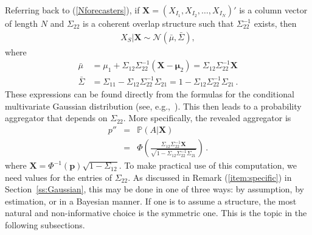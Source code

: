 \documentclass[11pt]{article}
\renewcommand{\P}{\mathbb{P}}
\theoremstyle{definition}
\theoremstyle{definition}
\def\one{{\bf 1}}
\def\P{{\mathbb P}}
\def\probit{p_{\rm probit}}
\begin{document}
Referring back to (\ref{Nforecasters}), if $\boldsymbol{X} = 
(X_{I_1}, X_{I_2},  \dots, X_{I_N})'$ is a column vector 
of length $N$ and $\Sigma_{22}$ is a coherent overlap structure 
such that $\Sigma_{22}^{-1}$ exists, then 
\begin{align*}
X_{S} | \boldsymbol{X} \sim \mathcal{N}\left(\bar{\mu}, \bar{\Sigma}\right), 
\end{align*}
where
\begin{align*}
\bar{\mu} &= \mu_1 + \Sigma_{12} \Sigma_{22}^{-1} 
  (\boldsymbol{X} - \boldsymbol{\mu}_2) 
  = \Sigma_{12} \Sigma_{22}^{-1} \boldsymbol{X} \\
 \bar{\Sigma}&= \Sigma_{11} - \Sigma_{12} \Sigma_{22}^{-1} \Sigma_{21} 
 = 1 - \Sigma_{12} \Sigma_{22}^{-1} \Sigma_{21}   \, .
\end{align*}
These expressions can be found directly from the formulas for
the conditional multivariate Gaussian distribution (see, 
e.g.,~\citealt[Result~5.2.10, page~156]{ravishanker2001first}). 
This then leads to a probability aggregator that depends on 
$\Sigma_{22}$.  More specifically, the revealed aggregator is
\begin{eqnarray}
p'' & = & \P\left(A  | \boldsymbol{X}\right)  \nonumber \\
&=& \Phi\left( \frac{\Sigma_{12} \Sigma_{22}^{-1} \boldsymbol{X}}
   {\sqrt{1 - \Sigma_{12} \Sigma_{22}^{-1} \Sigma_{21}}}\right) 
\label{GeneralAggregator} \, .
\end{eqnarray}
 where $\boldsymbol{X} = \Phi^{-1}(\boldsymbol{p})\sqrt{1-\Sigma_{12}}$. To make practical use of this computation, we need values
for the entries of $\Sigma_{22}$.  As discussed in 
Remark (\ref{item:specific}) in Section~\ref{ss:Gaussian},
this may be done in one of three ways: by assumption, 
by estimation, or in a Bayesian manner. If one is to assume a structure, the most natural and non-informative
choice is the symmetric one. This is the topic in the following subsections.
\end{document}
